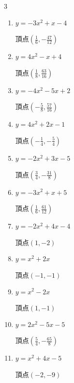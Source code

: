 \begin{multicols}{3}
\begin{enumerate}
  \item $\displaystyle y=-3x^{2}+x-4$

        $\displaystyle 頂点\left( \frac{1}{6} , -\frac{47}{12} \right)$

  \item $\displaystyle y=4x^{2}-x+4$

        $\displaystyle 頂点\left( \frac{1}{8} , \frac{63}{16} \right)$

  \item $\displaystyle y=-4x^{2}-5x+2$

        $\displaystyle 頂点\left( -\frac{5}{8} , \frac{57}{16} \right)$

  \item $\displaystyle y=4x^{2}+2x-1$

        $\displaystyle 頂点\left( -\frac{1}{4} , -\frac{5}{4} \right)$

\columnbreak %

\resetques

  \item $\displaystyle y=-2x^{2}+3x-5$

        $\displaystyle 頂点\left( \frac{3}{4} , -\frac{31}{8} \right)$

  \item $\displaystyle y=-3x^{2}+x+5$

        $\displaystyle 頂点\left( \frac{1}{6} , \frac{61}{12} \right)$

  \item $\displaystyle y=-2x^{2}+4x-4$

        $\displaystyle 頂点\left( 1 , -2 \right)$

  \item $\displaystyle y=x^{2}+2x$

        $\displaystyle 頂点\left( -1 , -1 \right)$

  \item $\displaystyle y=x^{2}-2x$

        $\displaystyle 頂点\left( 1 , -1 \right)$

\columnbreak %

  \item $\displaystyle y=2x^{2}-5x-5$

        $\displaystyle 頂点\left( \frac{5}{4} , -\frac{65}{8} \right)$

  \item $\displaystyle y=x^{2}+4x-5$

        $\displaystyle 頂点\left( -2 , -9 \right)$


\end{enumerate}
\end{multicols}
